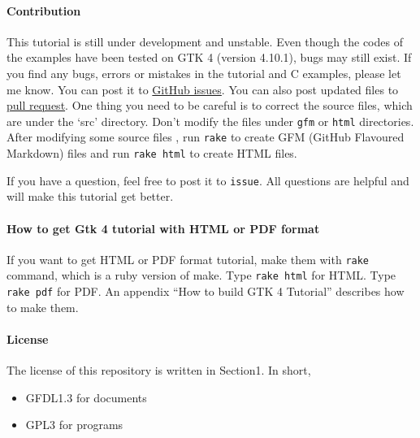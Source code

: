\paragraph{Contribution}\label{contribution}

This tutorial is still under development and unstable. Even though the
codes of the examples have been tested on GTK 4 (version 4.10.1), bugs
may still exist. If you find any bugs, errors or mistakes in the
tutorial and C examples, please let me know. You can post it to
\href{https://github.com/ToshioCP/Gtk4-tutorial/issues}{GitHub issues}.
You can also post updated files to
\href{https://github.com/ToshioCP/Gtk4-tutorial/pulls}{pull request}.
One thing you need to be careful is to correct the source files, which
are under the `src' directory. Don't modify the files under
\passthrough{\lstinline!gfm!} or \passthrough{\lstinline!html!}
directories. After modifying some source files , run
\passthrough{\lstinline!rake!} to create GFM (GitHub Flavoured Markdown)
files and run \passthrough{\lstinline!rake html!} to create HTML files.

If you have a question, feel free to post it to
\passthrough{\lstinline!issue!}. All questions are helpful and will make
this tutorial get better.

\paragraph{How to get Gtk 4 tutorial with HTML or PDF
format}\label{how-to-get-gtk-4-tutorial-with-html-or-pdf-format}

If you want to get HTML or PDF format tutorial, make them with
\passthrough{\lstinline!rake!} command, which is a ruby version of make.
Type \passthrough{\lstinline!rake html!} for HTML. Type
\passthrough{\lstinline!rake pdf!} for PDF. An appendix ``How to build
GTK 4 Tutorial'' describes how to make them.

\paragraph{License}\label{license}

The license of this repository is written in Section1. In short,

\begin{itemize}
\tightlist
\item
  GFDL1.3 for documents
\item
  GPL3 for programs
\end{itemize}
